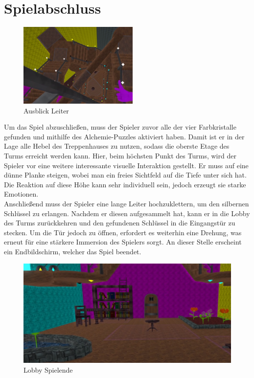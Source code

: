 \section{Spielabschluss}
\begin{figure}
	\vspace*{-0.5cm}
	\includegraphics[width=5.9cm]{Pictures/Ausblick_Leiter}
	\caption{Ausblick Leiter}
	\vspace*{-0.5cm}
	\label{fig:leiter}
\end{figure}
Um das Spiel abzuschließen, muss der Spieler zuvor alle der vier Farbkristalle gefunden und mithilfe des Alchemie-Puzzles aktiviert haben. Damit ist er in der Lage alle Hebel des Treppenhauses zu nutzen, sodass die oberste Etage des Turms erreicht werden kann. Hier, beim höchsten Punkt des Turms, wird der Spieler vor eine weitere interessante visuelle Interaktion gestellt. Er muss auf eine dünne Planke steigen, wobei man ein freies Sichtfeld auf die Tiefe unter sich hat. Die Reaktion auf diese Höhe kann sehr individuell sein, jedoch erzeugt sie starke Emotionen.\\
Anschließend muss der Spieler eine lange Leiter hochzuklettern, um den silbernen Schlüssel zu erlangen. Nachdem er diesen aufgesammelt hat, kann er in die Lobby des Turms zurückkehren und den gefundenen Schlüssel in die Eingangstür zu stecken. Um die Tür jedoch zu öffnen, erfordert es weiterhin eine Drehung, was erneut für eine stärkere Immersion des Spielers sorgt. An dieser Stelle erscheint ein Endbildschirm, welcher das Spiel beendet.
\begin{figure}[h]
	\centering
	\includegraphics[width=\textwidth/2]{Pictures/Lobby_Final}
	\caption{Lobby Spielende}
	\label{fig:lobby_final}
\end{figure}